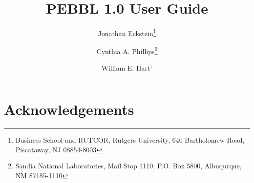 \documentclass[12pt,letter]{article}
\begin{document}
\title{
PEBBL 1.0 User Guide
}

\author{
Jonathan Eckstein\thanks{
Business School and RUTCOR, Rutgers University,
640 Bartholomew Road, Piscataway, NJ 08854-8003
}
\and
Cynthia A. Phillips\thanks{
Sandia National Laboratories, Mail Stop 1110, P.O. Box
5800, Albuqurque, NM 87185-1110}
\and
William E. Hart$^{\dagger}$
}

\maketitle

\begin{abstract}

\end{abstract}

\newpage

\tableofcontents

\newpage



\section*{Acknowledgements}





\end{document}
